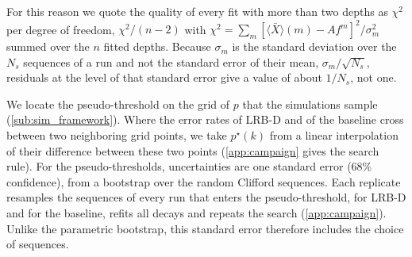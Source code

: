 For this reason we quote the quality of every fit with more than two depths as $\chi^2$ per degree of freedom, $\chi^2/(n-2)$ with $\chi^2 = \sum_m [\langle \bar{X} \rangle(m) - A f^m]^2/\sigma_m^2$ summed over the $n$ fitted depths. Because $\sigma_m$ is the standard deviation over the $N_s$ sequences of a run and not the standard error of their mean, $\sigma_m/\sqrt{N_s}$, residuals at the level of that standard error give a value of about $1/N_s$, not one.

We locate the pseudo-threshold on the grid of $p$ that the simulations sample (\autoref{sub:sim_framework}). Where the error rates of LRB-D and of the baseline cross between two neighboring grid points, we take $p^\star(k)$ from a linear interpolation of their difference between these two points (\autoref{app:campaign} gives the search rule). For the pseudo-thresholds, uncertainties are one standard error (68\% confidence), from a bootstrap over the random Clifford sequences. Each replicate resamples the sequences of every run that enters the pseudo-threshold, for LRB-D and for the baseline, refits all decays and repeats the search (\autoref{app:campaign}). Unlike the parametric bootstrap, this standard error therefore includes the choice of sequences.
